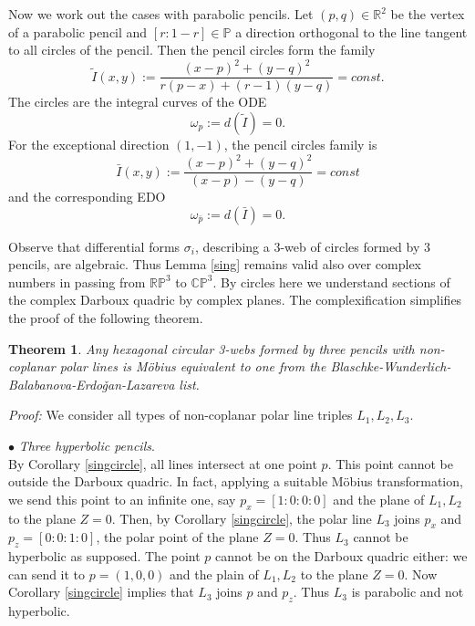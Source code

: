\documentclass[11pt,a4paper]{article}
\newtheorem{theorem}{Theorem}
\begin{document}
Now we work out the cases with parabolic pencils.   Let $(p,q)\in \mathbb{R}^2$ be the vertex of a parabolic pencil and $[r:1-r]\in \mathbb{P}$ a direction orthogonal to the line tangent to all circles of the pencil.  Then the pencil circles form the family 
$$
\tilde{I}(x,y):=\frac{(x-p)^2 + (y-q)^2}{r(p-x) + (r - 1)(y - q)}=const. 
$$
The circles are the integral curves of the ODE
\begin{equation}\label{parabolic}
\omega_p:=d(\tilde{I})=0. 
\end{equation}
For the exceptional direction $(1,-1)$, the pencil circles family is
$$
\bar{I}(x,y):=\frac{(x-p)^2 + (y-q)^2}{(x-p) - (y - q)}=const 
$$
and the corresponding EDO 
\begin{equation}\label{parabolicex}
\omega_{\bar{p}}:=d(\bar{I})=0. 
\end{equation}

\medskip

Observe that differential forms $\sigma_i$, describing a 3-web of circles formed by 3 pencils,   are algebraic. Thus Lemma \ref{sing} remains valid also over complex numbers in passing from $\mathbb{RP}^3$ to $\mathbb{CP}^3$. By circles here we understand  sections of the complex Darboux quadric by complex planes. The complexification simplifies the proof of the following theorem. 


\begin{theorem}\cite{S-05}\label{3pencils} 
Any hexagonal circular 3-webs formed by three pencils with non-coplanar polar lines is M\"obius equivalent to one from the Blaschke-Wunderlich-Balabanova-Erdo\v{g}an-Lazareva list.  
\end{theorem} 
{\it Proof:} We consider all types of non-coplanar polar line triples $L_1,L_2,L_3$.

{$\bullet$ \it Three hyperbolic pencils}.\\  By Corollary \ref{singcircle}, all lines intersect at one point $p$. This point cannot be outside the Darboux quadric. In fact, applying a suitable Möbius transformation, we send this point to an infinite one, say $p_x=[1:0:0:0]$ and the plane of $L_1,L_2$ to the plane  $Z=0$. Then, by Corollary \ref{singcircle}, the polar line $L_3$ joins $p_x$ and $p_z=[0:0:1:0]$,  the polar point of the plane $Z=0$. Thus $L_3$ cannot be hyperbolic as supposed.  The point $p$ cannot be on the Darboux quadric either: we can send it to $p=(1,0,0)$ and the plain of $L_1,L_2$ to the plane  $Z=0$. Now  Corollary \ref{singcircle} implies that $L_3$ joins $p$ and $p_z$. Thus $L_3$ is parabolic and not hyperbolic. 
\end{document}
